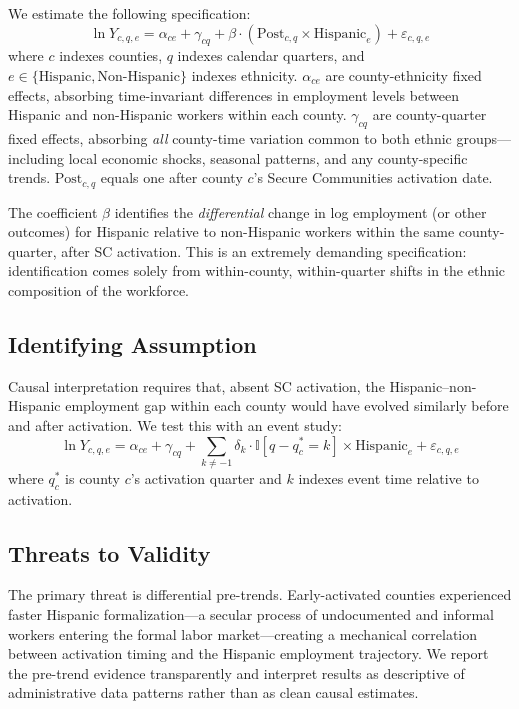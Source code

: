 \documentclass[12pt]{article}
\newcommand{\ind}{\mathbb{I}}
\begin{document}
We estimate the following specification:
\begin{equation}
\ln Y_{c,q,e} = \alpha_{ce} + \gamma_{cq} + \beta \cdot (\text{Post}_{c,q} \times \text{Hispanic}_e) + \varepsilon_{c,q,e}
\label{eq:ddd}
\end{equation}
where $c$ indexes counties, $q$ indexes calendar quarters, and $e \in \{\text{Hispanic}, \text{Non-Hispanic}\}$ indexes ethnicity. $\alpha_{ce}$ are county-ethnicity fixed effects, absorbing time-invariant differences in employment levels between Hispanic and non-Hispanic workers within each county. $\gamma_{cq}$ are county-quarter fixed effects, absorbing \textit{all} county-time variation common to both ethnic groups---including local economic shocks, seasonal patterns, and any county-specific trends. $\text{Post}_{c,q}$ equals one after county $c$'s Secure Communities activation date.

The coefficient $\beta$ identifies the \textit{differential} change in log employment (or other outcomes) for Hispanic relative to non-Hispanic workers within the same county-quarter, after SC activation. This is an extremely demanding specification: identification comes solely from within-county, within-quarter shifts in the ethnic composition of the workforce.

\subsection{Identifying Assumption}

Causal interpretation requires that, absent SC activation, the Hispanic--non-Hispanic employment gap within each county would have evolved similarly before and after activation. We test this with an event study:
\begin{equation}
\ln Y_{c,q,e} = \alpha_{ce} + \gamma_{cq} + \sum_{k \neq -1} \delta_k \cdot \ind[q - q^*_c = k] \times \text{Hispanic}_e + \varepsilon_{c,q,e}
\label{eq:eventstudy}
\end{equation}
where $q^*_c$ is county $c$'s activation quarter and $k$ indexes event time relative to activation.

\subsection{Threats to Validity}

The primary threat is differential pre-trends. Early-activated counties experienced faster Hispanic formalization---a secular process of undocumented and informal workers entering the formal labor market---creating a mechanical correlation between activation timing and the Hispanic employment trajectory. We report the pre-trend evidence transparently and interpret results as descriptive of administrative data patterns rather than as clean causal estimates.
\end{document}

